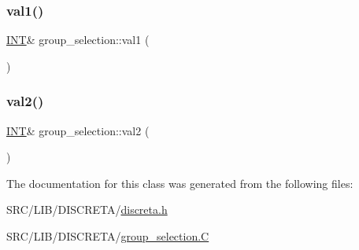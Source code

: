 \mbox{\label{classgroup__selection_a9b9578c0fe171d6aef98a1cb6926c4ea}} 
\subsubsection{\texorpdfstring{val1()}{val1()}}
{\footnotesize\ttfamily \mbox{\hyperlink{galois_8h_a09fddde158a3a20bd2dcadb609de11dc}{I\+NT}}\& group\+\_\+selection\+::val1 (\begin{DoxyParamCaption}{ }\end{DoxyParamCaption})\hspace{0.3cm}{\ttfamily [inline]}}

\mbox{\label{classgroup__selection_a9354cad24b302f9faf3924cbb9f7947c}} 
\subsubsection{\texorpdfstring{val2()}{val2()}}
{\footnotesize\ttfamily \mbox{\hyperlink{galois_8h_a09fddde158a3a20bd2dcadb609de11dc}{I\+NT}}\& group\+\_\+selection\+::val2 (\begin{DoxyParamCaption}{ }\end{DoxyParamCaption})\hspace{0.3cm}{\ttfamily [inline]}}



The documentation for this class was generated from the following files\+:\begin{DoxyCompactItemize}
\item 
S\+R\+C/\+L\+I\+B/\+D\+I\+S\+C\+R\+E\+T\+A/\mbox{\hyperlink{discreta_8h}{discreta.\+h}}\item 
S\+R\+C/\+L\+I\+B/\+D\+I\+S\+C\+R\+E\+T\+A/\mbox{\hyperlink{group__selection_8_c}{group\+\_\+selection.\+C}}\end{DoxyCompactItemize}

